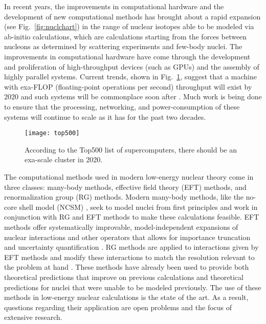 In recent years, the improvements in computational hardware and the development of new computational methods has brought about a rapid expansion (see Fig.~\ref{fig:nuclchart}) in the range of nuclear isotopes able to be modeled via ab-initio calculations, which are calculations starting from the forces between nucleons as determined by scattering experiments and few-body nuclei. The improvements in computational hardware have come through the development and proliferation of high-throughput devices (such as GPUs) and the assembly of highly parallel systems. Current trends, shown in Fig.~\ref{fig:top500}, suggest that a machine with exa-FLOP (floating-point operations per second) throughput will exist by 2020 and such systems will be commonplace soon after \cite{Top500}. Much work is being done to ensure that the processing, networking, and power-consumption of these systems will continue to scale as it has for the past two decades.

\begin{figure}[th!]
    \begin{center}
        \texttt{[image: top500]}
    \end{center}
    \caption{According to the Top500 list of supercomputers, there should be an exa-scale cluster in 2020.}
    \label{fig:top500}
\end{figure}

The computational methods used in modern low-energy nuclear theory come in three classes: many-body methods, effective field theory (EFT) methods, and renormalization group (RG) methods. Modern many-body methods, like the no-core shell model (NCSM) \cite{Barrett:2013nh}, seek to model nuclei from first principles and work in conjunction with RG and EFT methods to make these calculations feasible. EFT methods offer systematically improvable, model-independent expansions of nuclear interactions and other operators that allows for importance truncation and uncertainty quantification \cite{Machleidt:2011zz}\cite{Epelbaum:2008ga}. RG methods are applied to interactions given by EFT methods and modify these interactions to match the resolution relevant to the problem at hand \cite{Bogner:2009bt}. These methods have already been used to provide both theoretical predictions that improve on previous calculations and theoretical predictions for nuclei that were unable to be modeled previously. The use of these methods in low-energy nuclear calculations is the state of the art. As a result, questions regarding their application are open problems and the focus of extensive research. %

